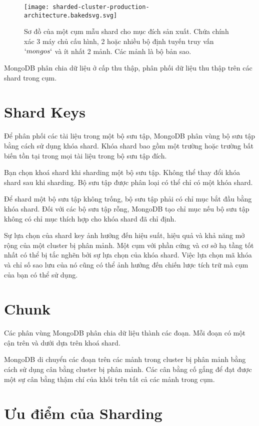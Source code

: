 \begin{figure}[h!]
\centering
\captionsetup{justification=centering,margin=1cm}
  	\texttt{[image: sharded-cluster-production-architecture.bakedsvg.svg]}
  \caption{Sơ đồ của một cụm mẫu shard cho mục đích sản xuất. Chứa chính xác 3 máy chủ cấu hình, 2 hoặc nhiều bộ định tuyến truy vấn $`mongos`$ và ít nhất 2 mảnh. Các mảnh là bộ bản sao.}
  \end{figure}

MongoDB phân chia dữ liệu ở cấp thu thập, phân phối dữ liệu thu thập trên các shard trong cụm.

\section{Shard Keys}
Để phân phối các tài liệu trong một bộ sưu tập, MongoDB phân vùng bộ sưu tập bằng cách sử dụng khóa shard. Khóa shard bao gồm một trường hoặc trường bất biến tồn tại trong mọi tài liệu trong bộ sưu tập đích.

Bạn chọn khoá shard khi sharding một bộ sưu tập. Không thể thay đổi khóa shard sau khi sharding. Bộ sưu tập được phân loại có thể chỉ có một khóa shard. 

Để shard một bộ sưu tập không trống, bộ sưu tập phải có chỉ mục bắt đầu bằng khóa shard. Đối với các bộ sưu tập rỗng, MongoDB tạo chỉ mục nếu bộ sưu tập không có chỉ mục thích hợp cho khóa shard đã chỉ định. 

Sự lựa chọn của shard key ảnh hưởng đến hiệu suất, hiệu quả và khả năng mở rộng của một cluster bị phân mảnh. Một cụm với phần cứng và cơ sở hạ tầng tốt nhất có thể bị tắc nghẽn bởi sự lựa chọn của khóa shard. Việc lựa chọn mã khóa và chỉ số sao lưu của nó cũng có thể ảnh hưởng đến chiến lược tích trữ mà cụm của bạn có thể sử dụng.

\section{Chunk}
Các phân vùng MongoDB phân chia dữ liệu thành các đoạn. Mỗi đoạn có một cận trên và dưới dựa trên khoá shard.

MongoDB di chuyển các đoạn trên các mảnh trong cluster bị phân mảnh bằng cách sử dụng cân bằng cluster bị phân mảnh. Các cân bằng cố gắng để đạt được một sự cân bằng thậm chí của khối trên tất cả các mảnh trong cụm.

\section{Ưu điểm của Sharding}

